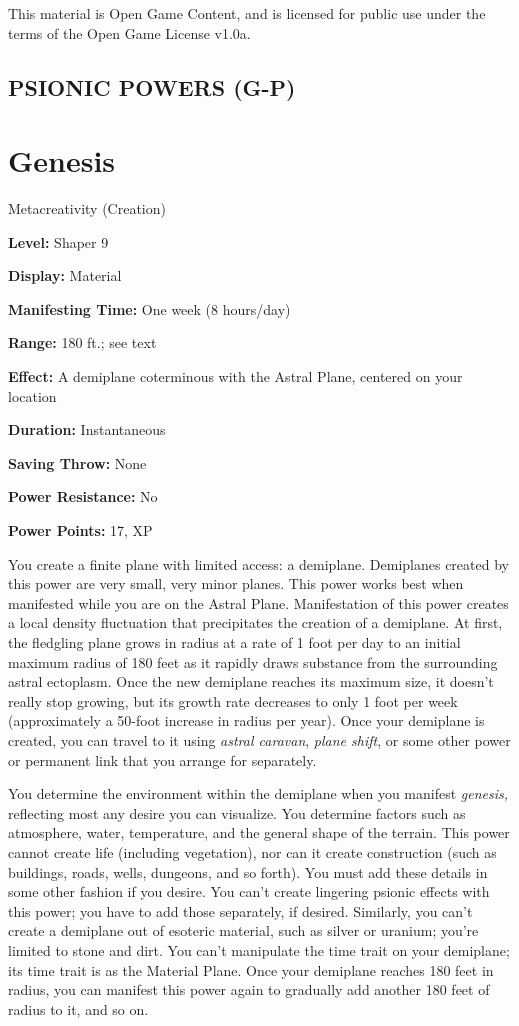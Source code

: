 \documentclass{article}
\begin{document}
This material is Open Game Content, and is licensed for public use under the terms 
of the Open Game License v1.0a.

\subsection*{{\LARGE{}PSIONIC POWERS (G-P)}}

\vspace{12pt}
\section*{Genesis}

Metacreativity (Creation)

\textbf{Level:} Shaper 9

\textbf{Display:} Material

\textbf{Manifesting Time:} One week (8 hours/day)

\textbf{Range:} 180 ft.; see text

\textbf{Effect:} A demiplane coterminous with the Astral Plane, centered on your 
location

\textbf{Duration:} Instantaneous

\textbf{Saving Throw:} None

\textbf{Power Resistance:} No

\textbf{Power Points:} 17, XP

You create a finite plane with limited access: a demiplane. Demiplanes created 
by this power are very small, very minor planes. This power works best when manifested 
while you are on the Astral Plane. Manifestation of this power creates a local 
density fluctuation that precipitates the creation of a demiplane. At first, the 
fledgling plane grows in radius at a rate of 1 foot per day to an initial maximum 
radius of 180 feet as it rapidly draws substance from the surrounding astral ectoplasm. 
Once the new demiplane reaches its maximum size, it doesn't really stop growing, 
but its growth rate decreases to only 1 foot per week (approximately a 50-foot 
increase in radius per year). Once your demiplane is created, you can travel to 
it using \textit{astral caravan}, \textit{plane shift}, or some other power or 
permanent link that you arrange for separately.

You determine the environment within the demiplane when you manifest \textit{genesis, 
}reflecting most any desire you can visualize. You determine factors such as atmosphere, 
water, temperature, and the general shape of the terrain. This power cannot create 
life (including vegetation), nor can it create construction (such as buildings, 
roads, wells, dungeons, and so forth). You must add these details in some other 
fashion if you desire. You can't create lingering psionic effects with this power; 
you have to add those separately, if desired. Similarly, you can't create a demiplane 
out of esoteric material, such as silver or uranium; you're limited to stone and 
dirt. You can't manipulate the time trait on your demiplane; its time trait is 
as the Material Plane. Once your demiplane reaches 180 feet in radius, you can 
manifest this power again to gradually add another 180 feet of radius to it, and 
so on.
\end{document}
